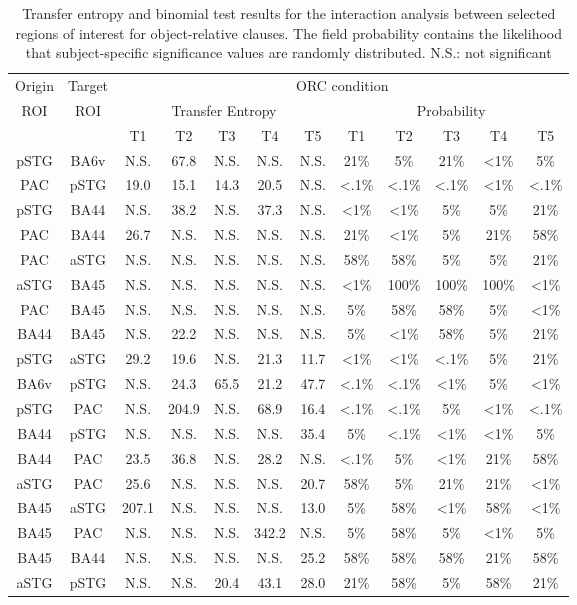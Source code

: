 \vspace{5mm}
\begin{table}[h]
\begin{center}
\begin{tabular}{cccccccccccc}
Origin & Target & \multicolumn{10}{c}{ORC condition}\\
ROI & ROI & \multicolumn{5}{c}{Transfer Entropy} & \multicolumn{5}{c}{Probability}\\
 & & T1 & T2 & T3 & T4 & \multicolumn{1}{c|}{T5} & T1 & T2 & T3 & T4 & T5\\ \hline
 pSTG & BA6v & N.S. & 67.8 & N.S. & N.S. & N.S. & 21\% & 5\% & 21\% & <1\% & 5\%\\ 
PAC & pSTG & 19.0 & 15.1 & 14.3 & 20.5 & N.S. & <.1\% & <.1\% & <.1\% & <1\% & <.1\%\\ 
pSTG & BA44 & N.S. & 38.2 & N.S. & 37.3 & N.S. & <1\% & <1\% & 5\% & 5\% & 21\%\\ 
PAC & BA44 & 26.7 & N.S. & N.S. & N.S. & N.S. & 21\% & <1\% & 5\% & 21\% & 58\%\\ 
PAC & aSTG & N.S. & N.S. & N.S. & N.S. & N.S. & 58\% & 58\% & 5\% & 5\% & 21\%\\ 
aSTG & BA45 & N.S. & N.S. & N.S. & N.S. & N.S. & <1\% & 100\% & 100\% & 100\% & <1\%\\ 
PAC & BA45 & N.S. & N.S. & N.S. & N.S. & N.S. & 5\% & 58\% & 58\% & 5\% & <1\%\\ 
BA44 & BA45 & N.S. & 22.2 & N.S. & N.S. & N.S. & 5\% & <1\% & 58\% & 5\% & 21\%\\ 
pSTG & aSTG & 29.2 & 19.6 & N.S. & 21.3 & 11.7 & <1\% & <1\% & <.1\% & 5\% & 21\%\\ 
BA6v & pSTG & N.S. & 24.3 & 65.5 & 21.2 & 47.7 & <.1\% & <.1\% & <1\% & 5\% & <1\%\\ 
pSTG & PAC & N.S. & 204.9 & N.S. & 68.9 & 16.4 & <.1\% & <.1\% & 5\% & <1\% & <.1\%\\ 
BA44 & pSTG & N.S. & N.S. & N.S. & N.S. & 35.4 & 5\% & <.1\% & <1\% & <1\% & 5\%\\ 
BA44 & PAC & 23.5 & 36.8 & N.S. & 28.2 & N.S. & <.1\% & 5\% & <1\% & 21\% & 58\%\\ 
aSTG & PAC & 25.6 & N.S. & N.S. & N.S. & 20.7 & 58\% & 5\% & 21\% & 21\% & <1\%\\ 
BA45 & aSTG & 207.1 & N.S. & N.S. & N.S. & 13.0 & 5\% & 58\% & <1\% & 58\% & <1\%\\ 
BA45 & PAC & N.S. & N.S. & N.S. & 342.2 & N.S. & 5\% & 58\% & 5\% & <1\% & 5\%\\ 
BA45 & BA44 & N.S. & N.S. & N.S. & N.S. & 25.2 & 58\% & 58\% & 58\% & 21\% & 58\%\\ 
aSTG & pSTG & N.S. & N.S. & 20.4 & 43.1 & 28.0 & 21\% & 58\% & 5\% & 58\% & 21\%\\ 
\end{tabular}
\caption{\label{4.4.TEvalues.a} Transfer entropy and binomial test results for the interaction analysis between selected regions of interest for object-relative clauses. The field probability contains the likelihood that subject-specific significance values are randomly distributed. N.S.: not significant}
\end{center}
\end{table}
